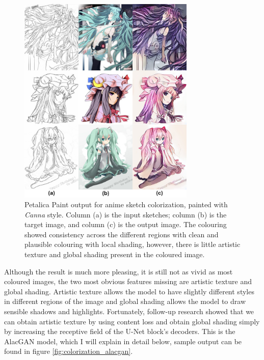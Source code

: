 \begin{figure}
    \centering
    \includegraphics[width=0.75\textwidth]{images/colorization/petalica.jpg}
    \caption{Petalica Paint output for anime sketch colorization, painted with \textit{Canna\protect\footnotemark}  style. Column (a) is the input sketches; column (b) is the target image, and column (c) is the output image.\cite{steinsDeepLearningProject2022} The colouring showed consistency across the different regions with clean and plausible colouring with local shading, however, there is little artistic texture and global shading present in the coloured image.} 
    \label{fig:colorization_petalica}
\end{figure}


Although the result is much more pleasing, it is still not as vivid as most coloured images, the two most obvious features missing are artistic texture and global shading. Artistic texture allows the model to have slightly different styles in different regions of the image and global shading allows the model to draw sensible shadows and highlights. Fortunately, follow-up research showed that we can obtain artistic texture by using content loss and obtain global shading simply by increasing the receptive field of the U-Net block's decoders\cite{ciUserGuidedDeepAnime2018}. This is the AlacGAN model, which I will explain in detail below, sample output can be found in figure \ref{fig:colorization_alacgan}.

